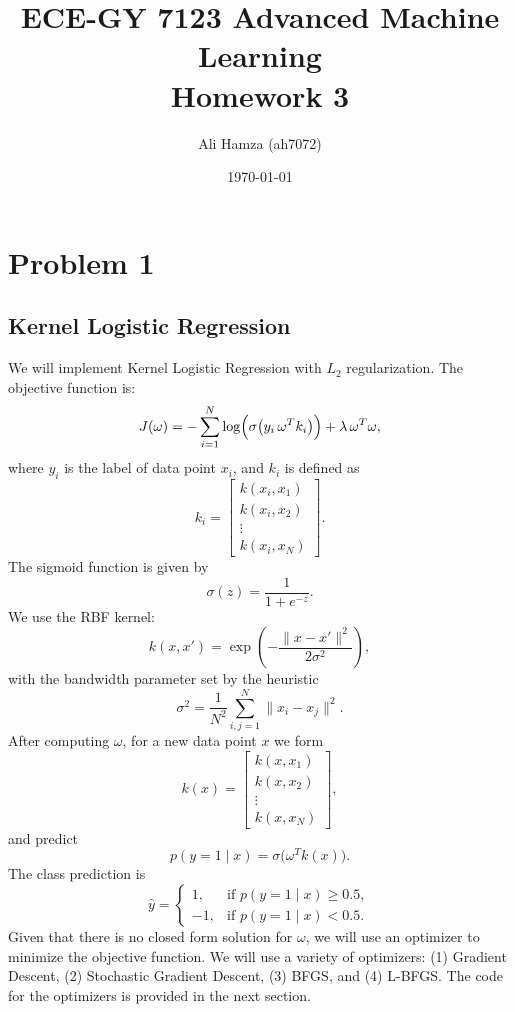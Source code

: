 \documentclass{article}
\title{ECE-GY 7123 Advanced Machine Learning \\ \Large Homework 3}
\author{Ali Hamza (ah7072)}
\date{\today}
\begin{document}
\maketitle

\section*{Problem 1}
\subsection*{Kernel Logistic Regression}
We will implement Kernel Logistic Regression with \(L_2\) regularization. The objective function is:
\begin{equation}
    J(\omega) = -\sum_{i=1}^{N} \log\Bigl(\sigma\bigl(y_i\,\omega^T k_i\bigr)\Bigr) + \lambda\, \omega^T\omega,
\end{equation}
where \(y_i\) is the label of data point \(x_i\), and \(k_i\) is defined as
\begin{equation}
    k_i = \begin{bmatrix} k(x_i, x_1) \\ k(x_i, x_2) \\ \vdots \\ k(x_i, x_N) \end{bmatrix}.
\end{equation}
The sigmoid function is given by
\begin{equation}
    \sigma(z) = \frac{1}{1 + e^{-z}}.
\end{equation}
We use the RBF kernel:
\begin{equation}
    k(x, x') = \exp\!\left(-\frac{\|x - x'\|^2}{2\sigma^2}\right),
\end{equation}
with the bandwidth parameter set by the heuristic
\begin{equation}
    \sigma^2 = \frac{1}{N^2} \sum_{i,j=1}^{N}\|x_i - x_j\|^2.
\end{equation}
  After computing \(\omega\), for a new data point \(x\) we form
\begin{equation}
    k(x) = \begin{bmatrix} k(x, x_1) \\ k(x, x_2) \\ \vdots \\ k(x, x_N) \end{bmatrix},
\end{equation}
and predict
\begin{equation}
    p(y=1\mid x) = \sigma\bigl(\omega^T k(x)\bigr).
\end{equation}
The class prediction is
\begin{equation}
  \hat{y} = \begin{cases}
    1, & \text{if } p(y=1\mid x) \geq 0.5, \\
    -1, & \text{if } p(y=1\mid x) < 0.5.
  \end{cases}
\end{equation}
Given that there is no closed form solution for \(\omega\), we will use an optimizer to minimize the objective function. We will use a variety of optimizers: (1) Gradient Descent, (2) Stochastic Gradient Descent, (3) BFGS, and (4) L-BFGS. The code for the optimizers is provided in the next section.
\end{document}
